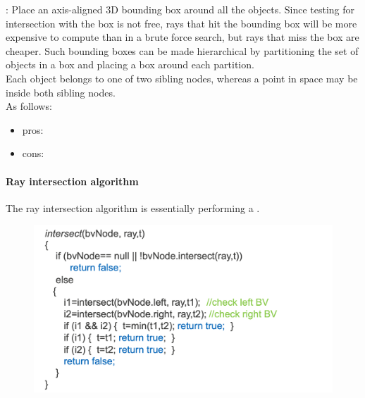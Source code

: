 \documentclass[11pt]{article}
\numberwithin{equation}{section}
\begin{document}
\noindent {}: Place an axis-aligned 3D bounding box around all the objects. Since testing for intersection with the box is not free, rays that hit the bounding box will be more expensive to compute than in a brute force search, but rays that miss the box are cheaper. Such bounding boxes can be made hierarchical by partitioning the set of objects in a box and placing a box around each partition.\\
\remark
Each object belongs to one of two sibling nodes, whereas a point in space may be inside both sibling nodes.\\
As follows:
\begin{itemize}
	\item pros: 
	\item cons: 
\end{itemize}
\paragraph{Ray intersection algorithm}
The ray intersection algorithm is essentially performing a .
	\begin{figure}[H]
	\centering
	\includegraphics[scale=0.4]{p11}
	\end{figure}
\end{document}
